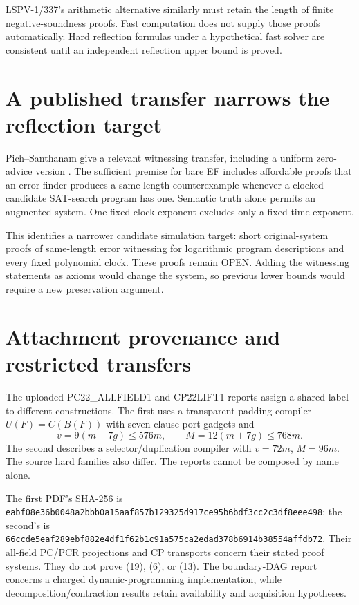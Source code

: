 \documentclass[11pt]{article}
\begin{document}
LSPV-1/337's arithmetic alternative similarly must retain the length
of finite negative-soundness proofs. Fast computation does not supply
those proofs automatically. Hard reflection formulas under a hypothetical
fast solver are consistent until an independent reflection upper bound is
proved.

\section{A published transfer narrows the reflection target}

Pich--Santhanam give a relevant witnessing transfer, including a uniform
zero-advice version \cite[Theorem 9 and Corollary 3]{pichsanthanam2023}.
The sufficient premise for bare EF includes affordable proofs that an
error finder produces a same-length counterexample whenever a clocked
candidate SAT-search program has one. Semantic truth alone permits an
augmented system. One fixed clock exponent excludes only a fixed time
exponent.

This identifies a narrower candidate simulation target: short
original-system proofs of same-length error witnessing for logarithmic
program descriptions and every fixed polynomial clock. These proofs remain
OPEN. Adding the witnessing statements as axioms would change the system,
so previous lower bounds would require a new preservation argument.

\section{Attachment provenance and restricted transfers}

The uploaded PC22\_ALLFIELD1 and CP22LIFT1 reports assign a shared label
to different constructions. The first uses a transparent-padding
compiler $U(F)=C(B(F))$ with seven-clause port gadgets and
\[
 v=9(m+7g)\le576m,\qquad M=12(m+7g)\le768m.
\]
The second describes a selector/duplication compiler with
$v=72m$, $M=96m$. The source hard families also differ.
The reports cannot be composed by name alone.

The first PDF's SHA-256 is
\texttt{eabf08e36b0048a2bbb0a15aaf857b129325d917ce95b6bdf3cc2c3df8eee498};
the second's is
\texttt{66ccde5eaf289ebf882e4df1f62b1c91a575ca2edad378b6914b38554affdb72}.
Their all-field PC/PCR projections and CP transports concern their stated
proof systems. They do not prove (19), (6), or (13).
The boundary-DAG report concerns a charged dynamic-programming
implementation, while decomposition/contraction results retain
availability and acquisition hypotheses.
\end{document}
